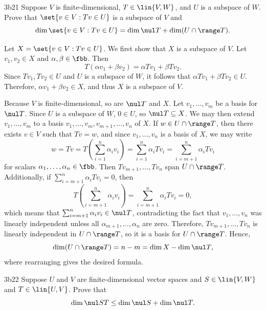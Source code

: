 \begin{exercise}{3b21}
    Suppose $V$ is finite-dimensional, $T \in \lin{V, W}$, and $U$ is a subspace of $W$.
	Prove that $\set{v \in V : Tv \in U}$ is a subspace of $V$ and
    \[
    	\dim\set{v \in V : Tv \in U} = \dim \nul T + \dim(U \cap \range T).
    \]
\end{exercise}

\begin{sol}
    Let $X = \set{v \in V : Tv \in U}$.
	We first show that $X$ is a subspace of $V$.
	Let $v_1, v_2 \in X$ and $\alpha, \beta \in \fbb$.
	Then
    \[
    	T(\alpha v_1 + \beta v_2) = \alpha Tv_1 + \beta Tv_2.
    \]
    Since $Tv_1, Tv_2 \in U$ and $U$ is a subspace of $W$, it follows that $\alpha Tv_1 + \beta Tv_2 \in U$.
	Therefore, $\alpha v_1 + \beta v_2 \in X$, and thus $X$ is a subspace of $V$.

    Because $V$ is finite-dimensional, so are $\nul T$ and $X$.
    Let $v_1, \ldots, v_m$ be a basis for $\nul T$.
    Since $U$ is a subspace of $W$, $0 \in U$, so $\nul T \subseteq X$.
    We may then extend $v_1, \ldots, v_m$ to a basis $v_1, \ldots, v_m, v_{m+1}, \ldots, v_n$ of $X$.
    If $w \in U \cap \range T$, then there exists $v \in V$ such that $Tv = w$, and since $v_1, \ldots, v_n$ is a basis of $X$, we may write
    \[
        w = Tv = T\left(\sum_{i=1}^{n} \alpha_i v_i\right) = \sum_{i=1}^{n} \alpha_i Tv_i = \sum_{i=m+1}^{n} \alpha_i Tv_i
    \]
    for scalars $\alpha_1, \ldots, \alpha_n \in \fbb$.
    Then $Tv_{m+1}, \ldots, Tv_n$ span $U \cap \range T$.
    Additionally, if $\sum_{i=m+1}^{n} \alpha_i Tv_i = 0$, then
    \[
        T\left(\sum_{i=m+1}^{n} \alpha_i v_i\right) = \sum_{i=m+1}^{n} \alpha_i Tv_i = 0,
    \]
    which means that $\sum_{i=m+1}^{n} \alpha_i v_i \in \nul T$, contradicting the fact that $v_1, \ldots, v_n$ was linearly independent unless all $\alpha_{m+1}, \ldots, \alpha_n$ are zero.
    Therefore, $Tv_{m+1}, \ldots, Tv_n$ is linearly independent in $U \cap \range T$, so it is a basis for $U \cap \range T$.
    Hence,
    \[
        \dim(U \cap \range T) = n - m = \dim X - \dim \nul T,
    \]
    where rearranging gives the desired formula.
\end{sol}

\begin{exercise}{3b22}
    Suppose $U$ and $V$ are finite-dimensional vector spaces and $S \in \lin{V, W}$ and $T \in \lin{U, V}$.
	Prove that
    \[
    	\dim \nul ST \leq \dim \nul S + \dim \nul T.
    \]
\end{exercise}

